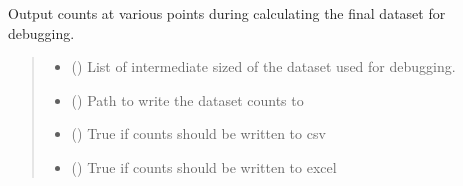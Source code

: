 \documentclass[letterpaper,10pt,english]{sphinxmanual}
\begin{document}
\begin{fulllineitems}
\label{\detokenize{get_stats:get_stats.output_debug_sizes}}
\pysigstartsignatures
{}
\pysigstopsignatures
\sphinxAtStartPar
Output counts at various points during calculating the final dataset for debugging.
\begin{quote}\begin{description}
\begin{itemize}
\item {} 
\sphinxAtStartPar
{} (\sphinxstyleliteralemphasis{\sphinxupquote{{[}}}\sphinxstyleliteralemphasis{\sphinxupquote{{[}}}\sphinxstyleliteralemphasis{\sphinxupquote{{]}}}\sphinxstyleliteralemphasis{\sphinxupquote{, }}\sphinxstyleliteralemphasis{\sphinxupquote{{[}}}\sphinxstyleliteralemphasis{\sphinxupquote{{]}}}\sphinxstyleliteralemphasis{\sphinxupquote{{]}}}) \textendash{} List of intermediate sized of the dataset used for debugging.

\item {} 
\sphinxAtStartPar
{} () \textendash{} Path to write the dataset counts to

\item {} 
\sphinxAtStartPar
{} () \textendash{} True if counts should be written to csv

\item {} 
\sphinxAtStartPar
{} () \textendash{} True if counts should be written to excel


\end{itemize}
\end{description}
\end{quote}
\end{fulllineitems}
\end{document}
